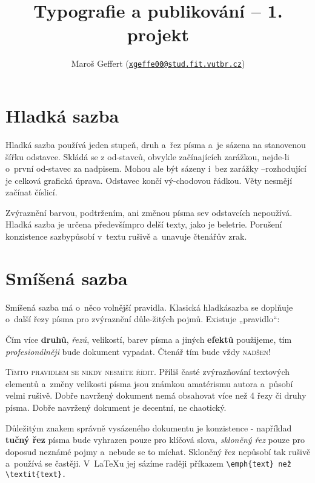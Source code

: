 \documentclass[10pt, a4paper, twocolumn]{article}
\title{Typografie a publikování -- 1. projekt}
\author{Maroš Geffert (\texttt{\href{mailto:xgeffe00@stud.fit.vutbr.cz}{xgeffe00@stud.fit.vutbr.cz}})}
\date{}
\begin{document}
\maketitle


\section{Hladká sazba}

Hladká sazba používá jeden stupeň, druh a~řez písma a~je sázena na stanovenou šířku odstavce. Skládá se z od-stavců, obvykle začínajících zarážkou, nejde-li o~první od-stavec za nadpisem. Mohou ale být sázeny i~bez zarážky –rozhodující je celková grafická úprava. Odstavec končí vý-chodovou řádkou. Věty nesmějí začínat číslicí.


Zvýraznění barvou, podtržením, ani změnou písma sev odstavcích nepoužívá. Hladká sazba je určena předevšímpro delší texty, jako je beletrie. Porušení konzistence sazbypůsobí v~textu rušivě a~unavuje čtenářův zrak.

\section{Smíšená sazba}
\label{smisena_sazba}
\medskip

Smíšená sazba má o~něco volnější pravidla. Klasická hladkásazba se doplňuje o~další řezy písma pro zvýraznění důle-žitých pojmů. Existuje „pravidlo“:

\begin{adjustwidth}{0.70cm}{0.70cm}
    \medskip
    Čím více \textbf{druhů}, \emph{řezů}, {\scriptsize velikostí}, barev písma {\sffamily a jiných} {\bfseries{\tiny efektů}} použijeme, tím \emph     {profesionálněji} bude dokument vypadat. Čtenář tím {\large bude} {\LARGE vždy} {\Huge\textsc {nadšen!}}
    \medskip
\end{adjustwidth}


\textsc {Tímto pravidlem se nikdy nesmíte řídit.} Příliš časté zvýrazňování textových elementů a~změny velikosti písma jsou známkou amatérismu autora a~působí velmi rušivě. Dobře navržený dokument nemá obsahovat více než
4 řezy či druhy písma. Dobře navržený dokument je decentní, ne chaotický.

Důležitým znakem správně vysázeného dokumentu je konzistence - například \textbf{tučný řez} písma bude vyhrazen pouze pro klíčová slova, \emph{skloněný řez} pouze pro doposud neznámé pojmy a~nebude se to míchat. Skloněný řez nepůsobí tak rušivě a~používá se častěji. V~\LaTeX u jej sázíme raději příkazem \verb|\emph{text} než \textit{text}.|
\end{document}
